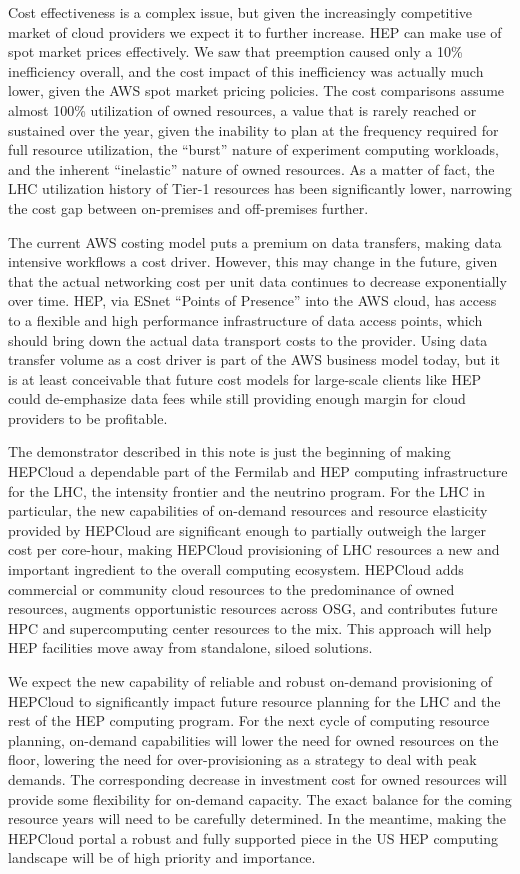 \documentclass[twocolumn]{svjour3}          %
\begin{document}
Cost effectiveness is a complex issue, but given the increasingly competitive market of cloud providers we expect it to further increase. HEP can make use of spot market prices effectively. We saw that preemption caused only a 10\% inefficiency overall, and the cost impact of this inefficiency was actually much lower, given the AWS spot market pricing policies. The cost comparisons assume almost 100\% utilization of owned resources, a value that is rarely reached or sustained over the year, given the inability to plan at the frequency required for full resource utilization, the ``burst'' nature of experiment computing workloads, and the inherent ``inelastic'' nature of owned resources. As a matter of fact, the LHC utilization history of Tier-1 resources has been significantly lower, narrowing the cost gap between on-premises and off-premises further.

The current AWS costing model puts a premium on data transfers, making data intensive workflows a cost driver. However, this may change in the future, given that the actual networking cost per unit data continues to decrease exponentially over time. HEP, via ESnet ``Points of Presence'' into the AWS cloud, has access to a flexible and high performance infrastructure of data access points, which should bring down the actual data transport costs to the provider. Using data transfer volume as a cost driver is part of the AWS business model today, but it is at least conceivable that future cost models for large-scale clients like HEP could de-emphasize data fees while still providing enough margin for cloud providers to be profitable.

The demonstrator described in this note is just the beginning of making HEPCloud a dependable part of the Fermilab and HEP computing infrastructure for the LHC, the intensity frontier and the neutrino program. For the LHC in particular, the new capabilities of on-demand resources and resource elasticity provided by HEPCloud are significant enough to partially outweigh the larger cost per core-hour, making HEPCloud provisioning of LHC resources a new and important ingredient to the overall computing ecosystem. HEPCloud adds commercial or community cloud resources to the predominance of owned resources, augments opportunistic resources across OSG, and contributes future HPC and supercomputing center resources to the mix. This approach will help HEP facilities move away from standalone, siloed solutions.

We expect the new capability of reliable and robust on-demand provisioning of HEPCloud to significantly impact future resource planning for the LHC and the rest of the HEP computing program. For the next cycle of computing resource planning, on-demand capabilities will lower the need for owned resources on the floor, lowering the need for over-provisioning as a strategy to deal with peak demands. The corresponding decrease in investment cost for owned resources will provide some flexibility for on-demand capacity. The exact balance for the coming resource years will need to be carefully determined. In the meantime, making the HEPCloud portal a robust and fully supported piece in the US HEP computing landscape will be of high priority and importance.
\end{document}
